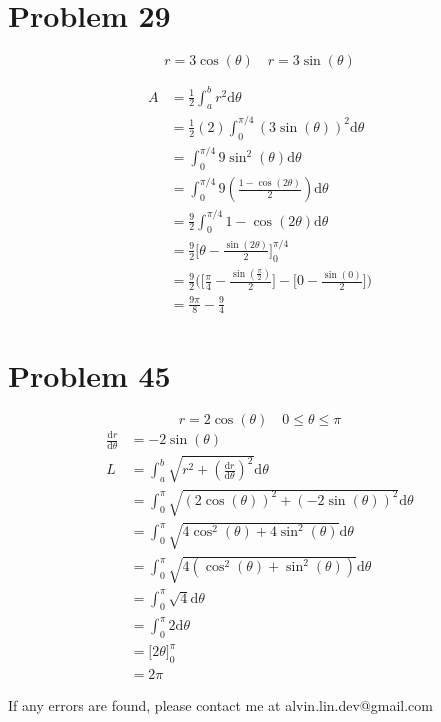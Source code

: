 \documentclass[letterpaper, 12pt]{article}
\newcommand*{\diff}{\mathrm{d}}
\newcommand*{\ddiff}[2]{\frac{\diff{#1}}{\diff{#2}}}
\begin{document}
\section*{Problem 29}
\[ r = 3\cos(\theta) \quad r = 3\sin(\theta) \]
\begin{center}
\end{center}
\begin{align*}
  A &= \frac{1}{2}\int_{a}^{b}{r^{2}\diff{\theta}} \\
  &= \frac{1}{2}(2)\int_{0}^{\pi/4}{(3\sin(\theta))^{2}\diff{\theta}} \\
  &= \int_{0}^{\pi/4}{9\sin^{2}(\theta)\diff{\theta}} \\
  &= \int_{0}^{\pi/4}{9(\frac{1-\cos(2\theta)}{2})\diff{\theta}} \\
  &= \frac{9}{2}\int_{0}^{\pi/4}{1-\cos(2\theta)\diff{\theta}} \\
  &= \frac{9}{2}\bigg[\theta-\frac{\sin(2\theta)}{2}\bigg]_{0}^{\pi/4} \\
  &= \frac{9}{2}\bigg(\big[\frac{\pi}{4}-\frac{\sin(\frac{\pi}{2})}{2}\big]-
    \big[0-\frac{\sin(0)}{2}\big]\bigg) \\
  &= \frac{9\pi}{8}-\frac{9}{4}
\end{align*}

\section*{Problem 45}
\[ r = 2\cos(\theta) \quad 0 \leq \theta \leq \pi \]
\begin{align*}
  \ddiff{r}{\theta} &= -2\sin(\theta) \\
  L &= \int_{a}^{b}{\sqrt{r^{2}+(\ddiff{r}{\theta})^{2}}\diff{\theta}} \\
  &= \int_{0}^{\pi}
    {\sqrt{(2\cos(\theta))^{2}+(-2\sin(\theta))^{2}}\diff{\theta}} \\
  &= \int_{0}^{\pi}
    {\sqrt{4\cos^{2}(\theta)+4\sin^{2}(\theta)}\diff{\theta}} \\
  &= \int_{0}^{\pi}
    {\sqrt{4(\cos^{2}(\theta)+\sin^{2}(\theta))}\diff{\theta}} \\
  &= \int_{0}^{\pi}{\sqrt{4}\diff{\theta}} \\
  &= \int_{0}^{\pi}{2\diff{\theta}} \\
  &= \bigg[2\theta\bigg]_{0}^{\pi} \\
  &= 2\pi
\end{align*}

\begin{center}
  If any errors are found, please contact me at alvin.lin.dev@gmail.com
\end{center}
\end{document}
